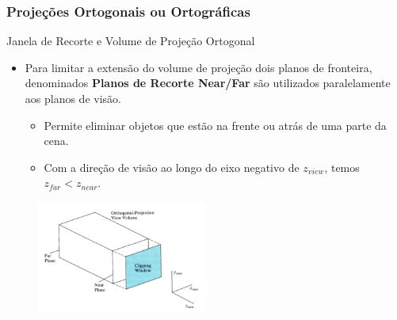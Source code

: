 \documentclass{beamer}
\begin{document}
\begin{frame}
\frametitle{Projeções Ortogonais ou Ortográficas}
	\begin{block}{Janela de Recorte e Volume de Projeção Ortogonal}
		\begin{itemize}
			\item Para limitar a extensão do volume de projeção dois planos de fronteira, denominados \textbf{Planos de Recorte Near/Far} são utilizados paralelamente aos planos de visão.
			\begin{itemize}
				\item Permite eliminar objetos que estão na frente ou atrás de uma parte da cena.
				\item Com a direção de visão ao longo do eixo negativo de $z_{view}$, temos $z_{far} < z_{near}$.
			\end{itemize}
		\end{itemize}
	\end{block}
	\begin{figure}[!h]
			\begin{center}
			\includegraphics[width=0.5\textwidth]{Figures/FarNea}
			\end{center}
	\end{figure}
\end{frame}
\end{document}
